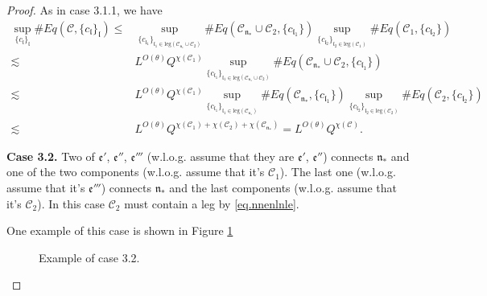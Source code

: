 \begin{proof}
    As in case 3.1.1, we have
    \begin{equation}
    \begin{split}
     \sup_{\{c_{\mathfrak{l}}\}_{\mathfrak{l}}}\#Eq(\mathcal{C},\{c_{\mathfrak{l}}\}_{\mathfrak{l}})
     \le&
     \sup_{\{c_{\mathfrak{l}_1}\}_{\mathfrak{l}_1\in \text{leg}(\mathcal{C}_{\mathfrak{n}_*}\cup \mathcal{C}_2)} } \# Eq(\mathcal{C}_{\mathfrak{n}_*}\cup \mathcal{C}_2,\{c_{\mathfrak{l}_1}\}) \sup_{\{c_{\mathfrak{l}_2}\}_{\mathfrak{l}_2\in \text{leg}(\mathcal{C}_1)} }\# Eq(\mathcal{C}_{1}, \{c_{\mathfrak{l}_2}\})
     \\
     \lesssim& L^{O(\theta)} Q^{\chi(\mathcal{C}_1)}\sup_{\{c_{\mathfrak{l}_1}\}_{\mathfrak{l}_1\in \text{leg}(\mathcal{C}_{\mathfrak{n}_*}\cup \mathcal{C}_2)} } \# Eq(\mathcal{C}_{\mathfrak{n}_*}\cup \mathcal{C}_2,\{c_{\mathfrak{l}_1}\})
     \\
     \lesssim& L^{O(\theta)} Q^{\chi(\mathcal{C}_1)} \sup_{\{c_{\mathfrak{l}_1}\}_{\mathfrak{l}_1\in \text{leg}(\mathcal{C}_{\mathfrak{n}_*})} } \# Eq(\mathcal{C}_{\mathfrak{n}_*},\{c_{\mathfrak{l}_1}\}) \sup_{\{c_{\mathfrak{l}_2}\}_{\mathfrak{l}_2\in \text{leg}(\mathcal{C}_2)} }\# Eq(\mathcal{C}_{2}, \{c_{\mathfrak{l}_2}\})
     \\
     \lesssim& L^{O(\theta)} Q^{\chi(\mathcal{C}_1)+\chi(\mathcal{C}_2)+\chi(\mathcal{C}_{\mathfrak{n}_*})}=L^{O(\theta)} Q^{\chi(\mathcal{C})}.
    \end{split}
    \end{equation}
    
    \textbf{Case 3.2.} Two of $\mathfrak{e}'$, $\mathfrak{e}''$, $\mathfrak{e}'''$ (w.l.o.g. assume that they are $\mathfrak{e}'$, $\mathfrak{e}''$) connects $\mathfrak{n}_*$ and one of the two components (w.l.o.g. assume that it's $\mathcal{C}_1$). The last one (w.l.o.g. assume that it's $\mathfrak{e}'''$) connects $\mathfrak{n}_*$ and the last components (w.l.o.g. assume that it's $\mathcal{C}_2$). In this case $\mathcal{C}_2$ must contain a leg by \eqref{eq.nnenlnle}.
    
    One example of this case is shown in Figure \ref{fig.examplecase3.2}
    \begin{figure}[H]
     \centering
     \caption{Example of case 3.2.}
     \label{fig.examplecase3.2}
    \end{figure}
     

\end{proof}
